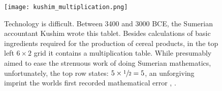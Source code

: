 



\begin{figure}[t]
    \centering
    \texttt{[image: kushim\_multiplication.png]}
    \caption[Technology is difficult. The accountant Kushim made mistakenly claimed $5 \times \sfrac{1}{2} = 5$.]{ Technology is difficult. Between 3400 and 3000 BCE, the Sumerian accountant Kushim wrote this tablet. Besides calculations of basic ingredients required for the production of cereal products, in the top left $6 \times 2$ grid it contains a multiplication table. While presumably aimed to ease the strenuous work of doing Sumerian mathematics, unfortunately, the top row states: $5 \times \sfrac{1}{2} = 5$, an unforgiving imprint the worlds first recorded mathematical error \parencite{nissen_archaic_1993, renn_learning_2019}, \parencite[photo credit][]{cuneiformdigitallibraryinitiativecdli_msvo_2018}.}
    \label{fig:kushim_multiplication}
\end{figure}

